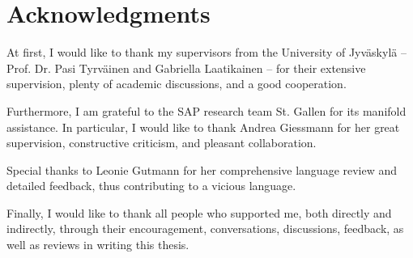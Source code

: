 \chapter*{Acknowledgments}\label{ch:Acknowledgments}
\thispagestyle{empty}

At first, I would like to thank my supervisors from the University of Jyv\"askyl\"a -- Prof. Dr. Pasi Tyrv\"ainen and Gabriella Laatikainen -- for their extensive supervision, plenty of academic discussions, and a good cooperation.

\vspace{0.5cm}
\noindent
Furthermore, I am grateful to the SAP research team St. Gallen for its manifold assistance. In particular, I would like to thank Andrea \mbox{Giessmann} for her great supervision, constructive criticism, and pleasant collaboration.

\vspace{0.5cm}
\noindent
Special thanks to Leonie Gutmann for her comprehensive language review and detailed feedback, thus contributing to a vicious language.

\vspace{0.5cm}
\noindent
Finally, I would like to thank all people who supported me, both directly and indirectly, through their encouragement, conversations, discussions, feedback, as well as reviews in writing this thesis.